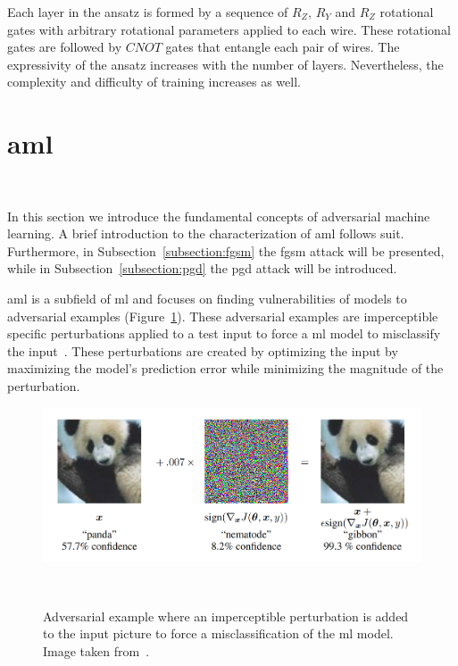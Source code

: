 Each layer in the ansatz is formed by a sequence of \(R_{Z}\),
\(R_{Y}\) and \(R_{Z}\) rotational gates with arbitrary
rotational parameters applied to each wire. These rotational
gates are followed by \(CNOT\) gates that entangle each pair
of wires. The expressivity of the ansatz increases with the
number of layers. Nevertheless, the complexity and difficulty
of training increases as well. \

\section{\acl{aml}}\label{section:aml} \

In this section we introduce the fundamental concepts of
adversarial machine learning. A brief introduction
to the characterization of \ac{aml} follows suit. Furthermore,
in Subsection~\ref{subsection:fgsm} the \ac{fgsm}
attack will be presented, while in Subsection~\ref{subsection:pgd}
the \ac{pgd} attack will be introduced. \

\acl{aml} is a subfield of \ac{ml} and focuses on finding vulnerabilities of
models to adversarial examples (Figure~\ref{fig:adversarial_example}).
These adversarial examples are imperceptible specific perturbations
applied to a test input to force a \ac{ml} model to misclassify the
input~\cite{szegedy_intriguing_2014}. These perturbations are created
by optimizing the input by maximizing the model's prediction error
while minimizing the magnitude of the perturbation. \

\begin{figure}[ht]
  \includegraphics[scale=0.35]{figures/adversarial_example.png}
  \centering
  \caption{Adversarial example where an imperceptible perturbation is added to the input picture to force a misclassification of the \ac{ml} model. Image taken from~\cite{goodfellow_explaining_2015}.}
~\label{fig:adversarial_example}
\end{figure} \

